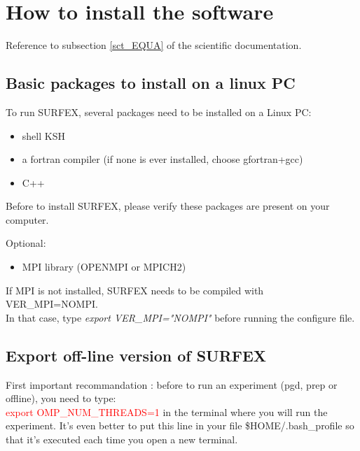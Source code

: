 
\section{How to install the software}
\begin{NoHyper}
Reference to subsection \ref{sct_EQUA} of the scientific documentation.
\end{NoHyper}

\newpage
\subsection{Basic packages to install on a linux PC}
To run SURFEX, several packages need to be installed on a Linux PC: 

\begin{itemize}
	\item shell KSH
	\item a fortran compiler (if none is ever installed, choose gfortran+gcc)
	\item C++
\end{itemize}

Before to install SURFEX, please verify these packages are present on your computer.

Optional:

\begin{itemize}
	\item MPI library (OPENMPI or MPICH2)
\end{itemize}

If MPI is not installed, SURFEX needs to be compiled with VER\_MPI=NOMPI. \\ In that case, type {\it{export VER\_MPI="NOMPI"}} before running the configure file.

\newpage
\subsection{Export off-line version of SURFEX}

First important recommandation : before to run an experiment (pgd, prep or offline), you need to type: \\ \textcolor{red}{export OMP\_NUM\_THREADS=1} in the terminal where you will run the experiment. It’s even better to put this line in your file \$HOME/.bash\_profile so that it’s executed each time you open a new terminal.


